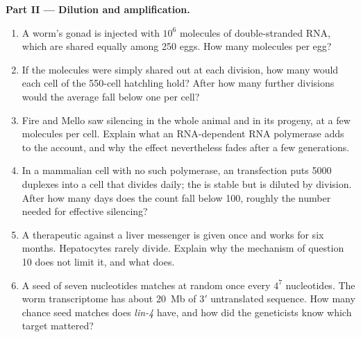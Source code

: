 \begin{problem}
\medskip
\noindent\textbf{Part II --- Dilution and amplification.}
\begin{enumerate}[resume]
  \item A worm's gonad is injected with $10^{6}$ molecules of
        double-stranded RNA, which are shared equally among \num{250}
        eggs. How many molecules per egg?
  \item If the molecules were simply shared out at each division,
        how many would each cell of the \num{550}-cell hatchling hold?
        After how many further divisions would the average fall below
        one per cell?
  \item Fire and Mello saw silencing in the whole animal and in its
        progeny, at a few molecules per cell. Explain what an
        RNA-dependent RNA polymerase adds to the account, and why
        the effect nevertheless fades after a few generations.
  \item In a mammalian cell with no such polymerase, an 
        transfection puts \num{5000} duplexes into a cell that divides
        daily; the  is stable but is diluted by division. After
        how many days does the count fall below \num{100}, roughly the
        number needed for effective silencing?
  \item A therapeutic  against a liver messenger is given once
        and works for six months. Hepatocytes rarely divide. Explain
        why the mechanism of question 10 does not limit it, and what
        does.
  \item A seed of seven nucleotides matches at random once every
        $4^{7}$ nucleotides. The worm transcriptome has about
        \qty{20}{Mb} of 3$'$ untranslated sequence. How many chance
        seed matches does \emph{lin-4} have, and how did the
        geneticists know which target mattered?
\end{enumerate}


\end{problem}
